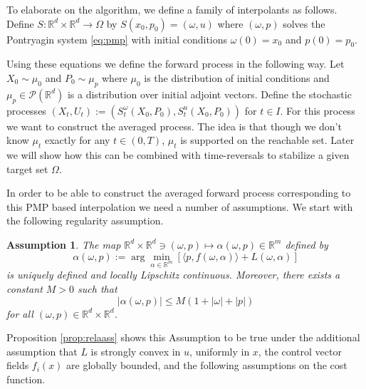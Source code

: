 \documentclass{article}
\newtheorem{assumption}[theorem]{Assumption}
\newcommand{\Rd}{\mathbb{R}^d}
\begin{document}
To elaborate on the algorithm, we define a family of interpolants as follows. Define $S: \Rd \times \mathbb{R}^d \rightarrow \Omega$ by $S(x_0,p_0) = (\omega, u)$ where $(\omega, p)$ solves the Pontryagin system \eqref{eq:pmp} with initial conditions $\omega(0) = x_0$ and $p(0) = p_0$.

Using these equations we define the forward process in the following way. Let $X_0 \sim \mu_0$ and $P_0 \sim \mu_p$ where $\mu_0$ is the distribution of initial conditions and $\mu_p \in \mathcal{P}(\mathbb{R}^d)$ is a distribution over initial adjoint vectors. Define the stochastic processes $(X_t, U_t) := (S^\omega_t(X_0,P_0), S^u_t(X_0,P_0))$ for $t \in I$. For this process we want to construct the averaged process. The idea is that though we don't know $\mu_t$ exactly for any $t \in (0,T)$, $\mu_t$ is supported on the reachable set. Later we will show how this can be combined with time-reversals to stabilize a given target set $\Omega$.

In order to be able to construct the averaged forward process corresponding to this PMP based interpolation we need a number of assumptions. We start with the following regularity assumption.


\begin{assumption}
\label{asmp:pmp-control}
The map $\mathbb{R}^d \times \mathbb{R}^d \ni (\omega, p) \mapsto \alpha(\omega,p) \in \mathbb{R}^m$ defined by
\[\alpha(\omega,p) := \arg\min_{\alpha \in \mathbb{R}^m} \left[\langle p, f(\omega,\alpha) \rangle + L(\omega,\alpha)\right]\]
is uniquely defined and locally Lipschitz continuous. Moreover, there exists a constant $M > 0$ such that 
\[|\alpha(\omega,p)| \leq M(1 + |\omega| + |p|)\]
for all $(\omega, p) \in \mathbb{R}^d \times \mathbb{R}^d$.
\end{assumption}

 Proposition \ref{prop:relaass} shows this Assumption to be true under the additional assumption that $L$ is strongly convex in 
$u$, uniformly in $x$, the control vector fields $f_i(x)$ are globally bounded, and the following assumptions on the cost function.
\end{document}
